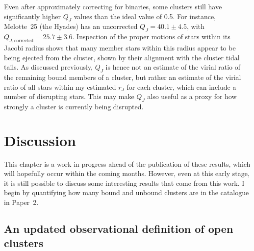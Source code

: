 Even after approximately correcting for binaries, some clusters still have significantly higher $Q_J$ values than the ideal value of 0.5. For instance, Melotte~25 (the Hyades) has an uncorrected $Q_J=40.1\pm4.5$, with $Q_{J,\text{corrected}}=25.7\pm3.6$. Inspection of the proper motions of stars within its Jacobi radius shows that many member stars within this radius appear to be being ejected from the cluster, shown by their alignment with the cluster tidal tails. As discussed previously, $Q_J$ is hence not an estimate of the virial ratio of the remaining bound members of a cluster, but rather an estimate of the virial ratio of all stars within my estimated $r_J$ for each cluster, which can include a number of disrupting stars. This may make $Q_J$ also useful as a proxy for how strongly a cluster is currently being disrupted.   


\section{Discussion}
\label{sec:dynamics:discussion}

This chapter is a work in progress ahead of the publication of these results, which will hopefully occur within the coming months. However, even at this early stage, it is still possible to discuss some interesting results that come from this work. I begin by quantifying how many bound and unbound clusters are in the catalogue in Paper~2.


\subsection{An updated observational definition of open clusters}
\label{sec:dynamics:discussion:definition}

